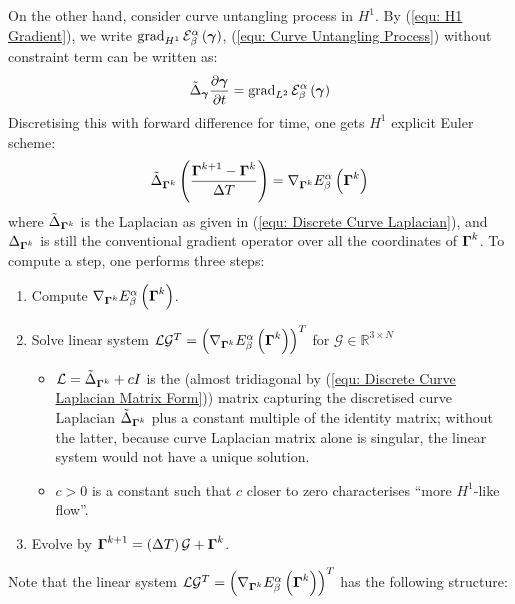 \documentclass[../dissertation.tex]{subfiles}
\begin{document}
On the other hand, consider curve untangling process in $H^1$.
By (\ref{equ: H1 Gradient}), we write $\operatorname{grad}_{H^1} \mathcal{E}_{\beta}^{\alpha} \left( \boldsymbol{\gamma} \right)$,
(\ref{equ: Curve Untangling Process}) without constraint term can be written as:
\begin{equation}
    \tilde{\Delta}_{\boldsymbol{\gamma}} \frac{\partial \boldsymbol{\gamma}}{\partial t} = \operatorname{grad}_{L^2} \mathcal{E}_{\beta}^{\alpha} \left( \boldsymbol{\gamma} \right)
\end{equation}
Discretising this with forward difference for time, one gets $H^1$ explicit Euler scheme:
\begin{equation}
    \tilde{\Delta}_{\boldsymbol{\Gamma}^k} \left( \frac{\boldsymbol{\Gamma}^{k+1} - \boldsymbol{\Gamma}^k}{\Delta T} \right) = \nabla_{\boldsymbol{\Gamma}^k} E_{\beta}^{\alpha} \left( \boldsymbol{\Gamma}^k \right)
\end{equation}
where $\tilde{\Delta}_{\boldsymbol{\Gamma}^k}$ is the Laplacian as given in (\ref{equ: Discrete Curve Laplacian}),
and $\Delta_{\boldsymbol{\Gamma}^k}$ is still the conventional gradient operator over all the coordinates of $\boldsymbol{\Gamma}^k$.
To compute a step, one performs three steps:
\begin{enumerate}
    \item Compute $\nabla_{\boldsymbol{\Gamma}^k} E_{\beta}^{\alpha} \left( \boldsymbol{\Gamma}^k \right)$.
    \item Solve linear system $\mathcal{L} \mathcal{G}^{T} = \left( \nabla_{\boldsymbol{\Gamma}^k} E_{\beta}^{\alpha} \left( \boldsymbol{\Gamma}^k \right) \right)^T$ for $\mathcal{G} \in \mathbb{R}^{3 \times N}$
        \begin{itemize}
            \item $\mathcal{L} = \tilde{\Delta}_{\boldsymbol{\Gamma}^k} + cI$ is the (almost tridiagonal by (\ref{equ: Discrete Curve Laplacian Matrix Form})) matrix capturing the discretised curve Laplacian $\tilde{\Delta}_{\boldsymbol{\Gamma}^k}$
                plus a constant multiple of the identity matrix; without the latter, because curve Laplacian matrix alone is singular, the linear system would not have a unique solution.
            \item $c > 0$ is a constant such that $c$ closer to zero characterises ``more $H^1$-like flow''.
        \end{itemize}
    \item Evolve by $\boldsymbol{\Gamma}^{k+1} = \left( \Delta T \right) \mathcal{G} + \boldsymbol{\Gamma}^k$.
\end{enumerate}
Note that the linear system $\mathcal{L} \mathcal{G}^T = \left( \nabla_{\boldsymbol{\Gamma}^k} E_{\beta}^{\alpha} \left( \boldsymbol{\Gamma}^k \right) \right)^T$ has the following structure:
\end{document}
